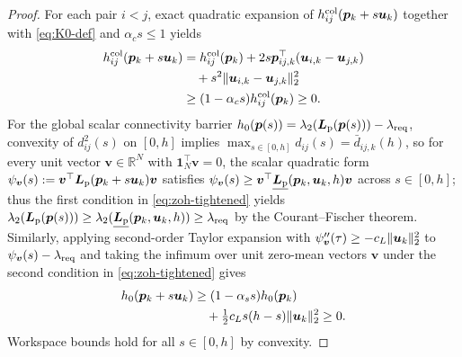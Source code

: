 \begin{proof}
For each pair $i<j$, exact quadratic expansion of $h_{ij}^{\mathrm{col}}(\boldsymbol{p}_k+s\boldsymbol{u}_k)$ together with \eqref{eq:K0-def} and $\alpha_c s\le 1$ yields
\begin{equation}
\begin{split}
 h_{ij}^{\mathrm{col}}(\boldsymbol{p}_k+s\boldsymbol{u}_k)&=h_{ij}^{\mathrm{col}}(\boldsymbol{p}_k)+2s\boldsymbol{p}_{ij,k}^{\top}(\boldsymbol{u}_{i,k}-\boldsymbol{u}_{j,k})\\
 &\quad+s^2\lVert\boldsymbol{u}_{i,k}-\boldsymbol{u}_{j,k}\rVert_2^2\\
 &\ge(1-\alpha_c s)h_{ij}^{\mathrm{col}}(\boldsymbol{p}_k)\ge 0.
\end{split}
\end{equation}
For the global scalar connectivity barrier $h_0(\boldsymbol{p}(s))=\lambda_2(\boldsymbol{L}_{\mathrm{p}}(\boldsymbol{p}(s)))-\lambda_{\mathrm{req}}$, convexity of $d_{ij}^2(s)$ on $[0,h]$ implies $\max_{s\in[0,h]}d_{ij}(s)=\bar d_{ij,k}(h)$, so for every unit vector $\boldsymbol v\in\mathbb R^N$ with $\boldsymbol 1_N^{\top}\boldsymbol v=0$, the scalar quadratic form $\psi_{\boldsymbol v}(s):=\boldsymbol v^{\top}\boldsymbol{L}_{\mathrm{p}}(\boldsymbol{p}_k+s\boldsymbol{u}_k)\boldsymbol v$ satisfies $\psi_{\boldsymbol v}(s)\ge\boldsymbol v^{\top}\underline{\boldsymbol{L}_{\mathrm{p}}}(\boldsymbol{p}_k,\boldsymbol{u}_k,h)\boldsymbol v$ across $s\in[0,h]$; thus the first condition in \eqref{eq:zoh-tightened} yields $\lambda_2(\boldsymbol{L}_{\mathrm{p}}(\boldsymbol{p}(s)))\ge\lambda_2(\underline{\boldsymbol{L}_{\mathrm{p}}}(\boldsymbol{p}_k,\boldsymbol{u}_k,h))\ge\lambda_{\mathrm{req}}$ by the Courant--Fischer theorem. Similarly, applying second-order Taylor expansion with $\psi_{\boldsymbol v}''(\tau)\ge -c_L\lVert\boldsymbol{u}_k\rVert_2^2$ to $\psi_{\boldsymbol v}(s)-\lambda_{\mathrm{req}}$ and taking the infimum over unit zero-mean vectors $\boldsymbol v$ under the second condition in \eqref{eq:zoh-tightened} gives
\begin{equation}
\begin{split}
 h_0(\boldsymbol{p}_k+s\boldsymbol{u}_k)&\ge(1-\alpha_s s)h_0(\boldsymbol{p}_k)\\
 &\quad+\tfrac12 c_L s(h-s)\lVert\boldsymbol{u}_k\rVert_2^2\ge 0.
\end{split}
\end{equation}
Workspace bounds hold for all $s\in[0,h]$ by convexity.
\end{proof}

